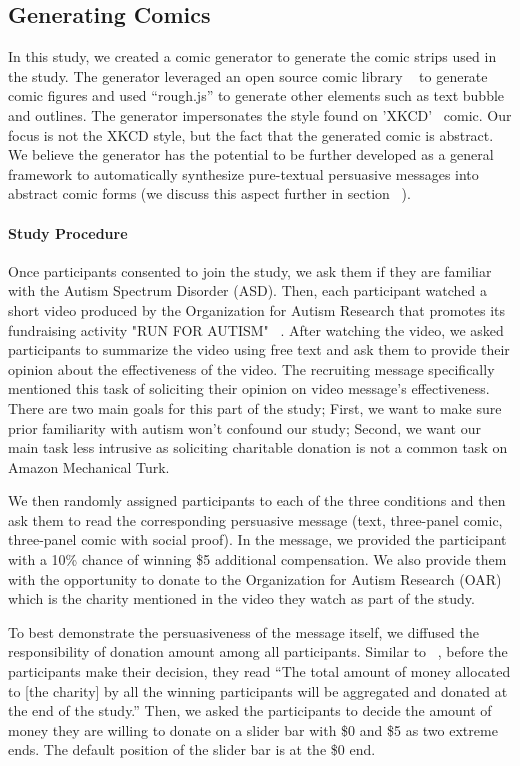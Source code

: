 \subsection{Generating Comics}
In this study, we created a comic generator to generate the comic strips used in the study. The generator leveraged an open source comic library ~\cite{cmx.io} to generate comic figures and used ``rough.js'' \cite{rough.js} to generate other elements such as text bubble and outlines. The generator impersonates the style found on 'XKCD'~\cite{munroe2009xkcd} comic. Our focus is not the XKCD style, but the fact that the generated comic is abstract. We believe the generator has the potential to be further developed as a general framework to automatically synthesize pure-textual persuasive messages into abstract comic forms (we discuss this aspect further in section ~).

\paragraph{Study Procedure} 
Once participants consented to join the study, we ask them if they are familiar with the Autism Spectrum Disorder (ASD). Then, each participant watched a short video produced by the Organization for Autism Research that promotes its fundraising activity "RUN FOR AUTISM" ~\cite{youtube_research}. After watching the video, we asked participants to summarize the video using free text and ask them to provide their opinion about the effectiveness of the video. The recruiting message specifically mentioned this task of soliciting their opinion on video message's effectiveness. There are two main goals for this part of the study; First, we want to make sure prior familiarity with autism won't confound our study; Second, we want our main task less intrusive as soliciting charitable donation is not a common task on Amazon Mechanical Turk.  

We then randomly assigned participants to each of the three conditions and then ask them to read the corresponding persuasive message (text, three-panel comic, three-panel comic with social proof). In the message, we provided the participant with a 10\% chance of winning \$5 additional compensation. We also provide them with the opportunity to donate to the Organization for Autism Research (OAR) which is the charity mentioned in the video they watch as part of the study.

To best demonstrate the persuasiveness of the message itself, we diffused the responsibility of donation amount among all participants. Similar to ~\textcite{lee2013does}, before the participants make their decision, they read ``The total amount of money allocated to [the charity] by all the winning participants will be aggregated and donated at the end of the study.'' Then, we asked the participants to decide the amount of money they are willing to donate on a slider bar with \$0 and \$5 as two extreme ends. The default position of the slider bar is at the \$0 end.

